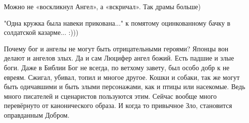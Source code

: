 \begin{itemize}
Можно не «воскликнул Ангел», а «вскричал». Так драмы больше)

 
"Одна кружка была навеки прикована..." к помятому оцинкованному бачку в солдатской казарме... :)))

 

Почему бог и ангелы не могут быть отрицательными героями? Японцы вон делают и
ангелов злых. Да и сам Люцифер ангел божий. Есть падшие и злые боги. Даже в
Библии Бог не всегда, по ветхому завету, был особо добр к не евреям. Сжигал,
убивал, топил и многое другое. Кошки и собаки, так же могут быть одичавшими и
быть злыми персонажами, как и птицы или насекомые. Ведь много писателей и
сценаристов пользуются этим. Сейчас вообще много перевёрнуто от канонического
образа. И когда то привычное Зло, становится оправданным Добром.
\end{itemize}


